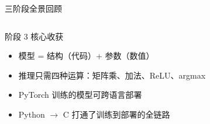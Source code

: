 \documentclass[aspectratio=169]{ctexbeamer}
\begin{document}
\begin{frame}[shrink=15]{三阶段全景回顾}
\begin{columns}[T]
\begin{block}{阶段 3 核心收获}
\footnotesize
\begin{itemize}
  \item 模型 = 结构（代码）+ 参数（数值）
  \item 推理只需四种运算：矩阵乘、加法、ReLU、argmax
  \item PyTorch 训练的模型可跨语言部署
  \item Python $\to$ C 打通了训练到部署的全链路
\end{itemize}
\end{block}
\end{columns}
\end{frame}

\end{document}
